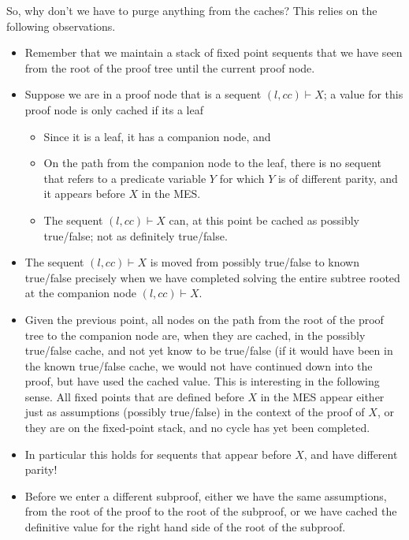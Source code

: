 \documentclass{article}
\newcommand{\loc}{l}
\newcommand{\region}{\mathit{cc}}
\begin{document}
So, why don’t we have to purge anything from the caches?
This relies on the following observations.
\begin{itemize}
\item Remember that we maintain a stack of fixed point sequents that we have seen from the root of the proof tree until the current proof node.
\item Suppose we are in a proof node that is a sequent $(\loc,\region) \vdash X$; a value for this proof node is only cached if its a leaf
  \begin{itemize}
	  \item Since it is a leaf, it has a companion node, and
	  \item On the path from the companion node to the leaf, there is no sequent that refers to a predicate variable $Y$ for which $Y$ is of different parity, and it appears before $X$ in the MES.
    \item The sequent $(\loc,\region) \vdash X$ can, at this point be cached as possibly true/false; not as definitely true/false.
  \end{itemize}
\item The sequent $(\loc,\region) \vdash X$ is moved from possibly true/false to known true/false precisely when we have completed solving the entire subtree rooted at the companion node $(\loc,\region) \vdash X$.
\item Given the previous point, all nodes on the path from the root of the proof tree to the companion node are, when they are cached, in the possibly true/false cache, and not yet know to be true/false (if it would have been in the known true/false cache, we would not have continued down into the proof, but have used the cached value. This is interesting in the following sense. All fixed points that are defined before $X$ in the MES appear either just as assumptions (possibly true/false) in the context of the proof of $X$, or they are on the fixed-point stack, and no cycle has yet been completed.
\item In particular this holds for sequents that appear before $X$, and have different parity!
\item Before we enter a different subproof, either we have the same assumptions, from the root of the proof to the root of the subproof, or we have cached the definitive value for the right hand side of the root of the subproof.
\end{itemize}
\end{document}
